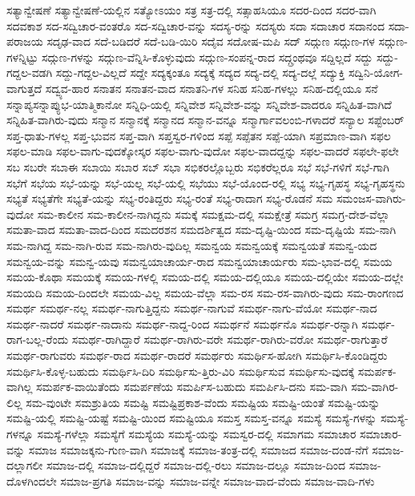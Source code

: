 {ಸತ್ಯಾನ್ವೇಷಣೆ
ಸತ್ಯಾನ್ವೇಷಣೆ-ಯಲ್ಲಿನ
ಸತ್ಯೋಽಯಂ
ಸತ್ರ
ಸತ್ರ-ದಲ್ಲಿ
ಸತ್ಸಾಹಸಿಯೂ
ಸದರ-ದಿಂದ
ಸದರ-ವಾಗಿ
ಸದವಕಾಶ
ಸದ-ಸದ್ವಿಚಾರ-ವಂತರೊ
ಸದ-ಸದ್ವಿಚಾರ-ವನ್ನು
ಸದಸ್ಯ-ರನ್ನು
ಸದಸ್ಯರು
ಸದಾ
ಸದಾಚಾರ
ಸದಾನಂದ
ಸದಾ-ಪರಾಜಯ
ಸದೃಢ-ವಾದ
ಸದೆ-ಬಡಿದರೆ
ಸದೆ-ಬಡಿ-ಯಿರಿ
ಸದೈವ
ಸದೋಷ-ಮಪಿ
ಸದ್
ಸದ್ಗುಣ
ಸದ್ಗುಣ-ಗಳ
ಸದ್ಗುಣ-ಗಳನ್ನಿಟ್ಟು
ಸದ್ಗುಣ-ಗಳನ್ನು
ಸದ್ಗುಣ-ವೆನ್ನಿಸಿ-ಕೊಳ್ಳುವುದು
ಸದ್ಗುಣ-ಸಂಪನ್ನ-ರಾದ
ಸದ್ಗ್ರಂಥವೂ
ಸದ್ದಿಲ್ಲದೆ
ಸದ್ದು
ಸದ್ದು-ಗದ್ದಲ-ವಡಗಿ
ಸದ್ದು-ಗದ್ದಲ-ವಿಲ್ಲದೆ
ಸದ್ದೇ
ಸದ್ಯಕ್ಕಂತೂ
ಸದ್ಯಕ್ಕೆ
ಸದ್ಯದ
ಸದ್ಯ-ದಲ್ಲಿ
ಸದ್ಯ-ದಲ್ಲೆ
ಸದ್ಯುಕ್ತಿ
ಸದ್ವಿನಿ-ಯೋಗ-ವಾಗುತ್ತದೆ
ಸದ್ವ್ಯವ-ಹಾರ
ಸನಾತನ
ಸನಾತನ-ವಾದ
ಸನಾತನಿ-ಗಳ
ಸನಿಹ
ಸನಿಹ-ಗಳಲ್ಲು
ಸನಿಹ-ದಲ್ಲಿಯೂ
ಸನೆ
ಸನ್ನಾಪ್ಯಸನ್ನಾಪ್ಯುಭ-ಯಾತ್ಮಿಕಾನೋ
ಸನ್ನಿಧಿ-ಯಲ್ಲಿ
ಸನ್ನಿವೇಶ
ಸನ್ನಿವೇಶ-ವನ್ನು
ಸನ್ನಿವೇಶ-ವಾದರೂ
ಸನ್ನಿಹಿತ-ವಾಗಿದೆ
ಸನ್ನಿಹಿತ-ವಾಗಿರು-ವುದು
ಸನ್ಮಾನ
ಸನ್ಮಾನಕ್ಕೆ
ಸನ್ಮಾನದ
ಸನ್ಮಾನ-ವನ್ನೂ
ಸನ್ಮಾರ್ಗಾವಲಂಬಿ-ಗಳಾದರೆ
ಸನ್ಯಾಲ
ಸಪ್ಟೆಂಬರ್
ಸಪ್ತ-ಧಾತು-ಗಳಲ್ಲ
ಸಪ್ತ-ಭುವನ
ಸಪ್ತ-ವಾಗಿ
ಸಪ್ತಸ್ವರ-ಗಳಿಂದ
ಸಪ್ಪೆ
ಸಪ್ಪೆತನ
ಸಪ್ಪೆ-ಯಾಗಿ
ಸಪ್ರಮಾಣ-ವಾಗಿ
ಸಫಲ
ಸಫಲ-ಮಾಡಿ
ಸಫಲ-ವಾಗು-ವುದಕ್ಕೋಸ್ಕರ
ಸಫಲ-ವಾಗು-ವುದೋ
ಸಫಲ-ವಾದದ್ದನ್ನು
ಸಫಲ-ವಾದರೆ
ಸಫಲೇ-ಫಲೇ
ಸಬ
ಸಬರೇ
ಸಬಾಈ
ಸಬಾಯಿ
ಸಬಾರ
ಸಬ್
ಸಭಾ
ಸಭಿಕರಲ್ಲೊಬ್ಬರು
ಸಭಿಕರೆಲ್ಲರೂ
ಸಭೆ
ಸಭೆ-ಗಳಿಗೆ
ಸಭೆ-ಗಾಗಿ
ಸಭೆಗೆ
ಸಭೆಯ
ಸಭೆ-ಯನ್ನು
ಸಭೆ-ಯಲ್ಲ
ಸಭೆ-ಯಲ್ಲಿ
ಸಭೆಯು
ಸಭೆ-ಯೊಂದ-ರಲ್ಲಿ
ಸಭ್ಯ
ಸಭ್ಯ-ಗೃಹಸ್ಥ
ಸಭ್ಯ-ಗೃಹಸ್ಥನು
ಸಭ್ಯತೆ
ಸಭ್ಯತೆಗೇ
ಸಭ್ಯತೆ-ಯನ್ನು
ಸಭ್ಯ-ರಂತಿದ್ದರು
ಸಭ್ಯ-ರಂತೆ
ಸಭ್ಯ-ರಾದಾಗ
ಸಭ್ಯ-ರೊಡನೆ
ಸಮ
ಸಮಂಜಸ-ವಾಗಿರು-ವುದೋ
ಸಮ-ಕಾಲೀನ
ಸಮ-ಕಾಲೀನ-ನಾಗಿದ್ದನು
ಸಮಕ್ಕೆ
ಸಮಕ್ಷಮ-ದಲ್ಲಿ
ಸಮಕ್ಷೇತ್ರೆ
ಸಮಗ್ರ
ಸಮಗ್ರ-ದೇಶ-ವೆಲ್ಲಾ
ಸಮತಾ-ವಾದ
ಸಮತಾ-ವಾದ-ದಿಂದ
ಸಮದರಶನ
ಸಮದರ್ಶಿತ್ವದ
ಸಮ-ದೃಷ್ಟಿ-ಯಿಂದ
ಸಮ-ದೃಷ್ಟಿಯೆ
ಸಮ-ನಾಗಿ
ಸಮ-ನಾಗಿದ್ದ
ಸಮ-ನಾಗಿ-ರುವ
ಸಮ-ನಾಗಿರು-ವುದಿಲ್ಲ
ಸಮನ್ವಯ
ಸಮನ್ವಯಕ್ಕೆ
ಸಮನ್ವಯತೆ
ಸಮನ್ವ-ಯದ
ಸಮನ್ವಯ-ವನ್ನು
ಸಮನ್ವ-ಯವು
ಸಮನ್ವಯಾಚಾರ್ಯ-ರಾದ
ಸಮನ್ವಯಾಚಾರ್ಯರು
ಸಮ-ಭಾವ-ದಲ್ಲಿ
ಸಮಯ
ಸಮಯ-ಕೊಥಾ
ಸಮಯಕ್ಕೆ
ಸಮಯ-ಗಳಲ್ಲಿ
ಸಮಯ-ದಲ್ಲಿ
ಸಮಯ-ದಲ್ಲಿಯೂ
ಸಮಯ-ದಲ್ಲಿಯೇ
ಸಮಯ-ದಲ್ಲೇ
ಸಮಯದಿ
ಸಮಯ-ದಿಂದಲೇ
ಸಮಯ-ವಿಲ್ಲ
ಸಮಯ-ವೆಲ್ಲಾ
ಸಮ-ರಸ
ಸಮ-ರಸ-ವಾಗಿರು-ವುದು
ಸಮ-ರಾಂಗಣದ
ಸಮರ್ಥ
ಸಮರ್ಥ-ನಲ್ಲ
ಸಮರ್ಥ-ನಾಗುತ್ತಿದ್ದನು
ಸಮರ್ಥ-ನಾಗುವೆ
ಸಮರ್ಥ-ನಾಗು-ವೆಯೋ
ಸಮರ್ಥ-ನಾದ
ಸಮರ್ಥ-ನಾದರೆ
ಸಮರ್ಥ-ನಾದಾನು
ಸಮರ್ಥ-ನಾದ್ದ-ರಿಂದ
ಸಮರ್ಥನೆ
ಸಮರ್ಥನೊ
ಸಮರ್ಥ-ರನ್ನಾಗಿ
ಸಮರ್ಥ-ರಾಗ-ಬಲ್ಲ-ರೆಂದು
ಸಮರ್ಥ-ರಾಗಿದ್ದಾರೆ
ಸಮರ್ಥ-ರಾಗಿರು-ವರೇ
ಸಮರ್ಥ-ರಾಗಿರು-ವರೋ
ಸಮರ್ಥ-ರಾಗುತ್ತಾರೆ
ಸಮರ್ಥ-ರಾಗುವರು
ಸಮರ್ಥ-ರಾದ
ಸಮರ್ಥ-ರಾದರೆ
ಸಮರ್ಥರು
ಸಮರ್ಥಿಸ-ಹೋಗಿ
ಸಮರ್ಥಿಸಿ-ಕೊಂಡಿದ್ದರು
ಸಮರ್ಥಿಸಿ-ಕೊಳ್ಳ-ಬಹುದು
ಸಮರ್ಥಿಸಿ-ದಿರಿ
ಸಮರ್ಥಿಸು-ತ್ತಿರು-ವಿರಿ
ಸಮರ್ಥಿಸುವ
ಸಮರ್ಥಿಸು-ವುದಕ್ಕೆ
ಸಮರ್ಪಕ-ವಾಗಿಲ್ಲ
ಸಮರ್ಪಕ-ವಾಯಿತೆಂದು
ಸಮರ್ಪಣೆಯ
ಸಮರ್ಪಿಸ-ಬಹುದು
ಸಮರ್ಪಿಸಿ-ದನು
ಸಮ-ವಾಗಿ
ಸಮ-ವಾಗಿರ-ಲಿಲ್ಲ
ಸಮ-ವುಂಟೇ
ಸಮಶ್ರುತಿಯ
ಸಮಷ್ಟಿ
ಸಮಷ್ಟಿಪ್ರಕಾಶ-ವೆಂದು
ಸಮಷ್ಟಿಯ
ಸಮಷ್ಟಿ-ಯಂತೆ
ಸಮಷ್ಟಿ-ಯನ್ನು
ಸಮಷ್ಟಿ-ಯಲ್ಲಿ
ಸಮಷ್ಟಿ-ಯಷ್ಟೆ
ಸಮಷ್ಟಿ-ಯಿಂದ
ಸಮಷ್ಟಿಯೂ
ಸಮಸ್ತ
ಸಮಸ್ತ-ವನ್ನೂ
ಸಮಸ್ಯೆ
ಸಮಸ್ಯೆ-ಗಳನ್ನು
ಸಮಸ್ಯೆ-ಗಳನ್ನೂ
ಸಮಸ್ಯೆ-ಗಳೆಲ್ಲಾ
ಸಮಸ್ಯೆಗೆ
ಸಮಸ್ಯೆಯ
ಸಮಸ್ಯೆ-ಯನ್ನು
ಸಮಸ್ವರ-ದಲ್ಲಿ
ಸಮಾಗಮ
ಸಮಾಚಾರ
ಸಮಾಚಾರ-ವನ್ನು
ಸಮಾಜ
ಸಮಾಜಕ್ಕನು-ಗುಣ-ವಾಗಿ
ಸಮಾಜಕ್ಕೆ
ಸಮಾಜ-ತಂತ್ರ-ದಲ್ಲಿ
ಸಮಾಜದ
ಸಮಾಜ-ದಂಡ-ನೆಗೆ
ಸಮಾಜ-ದಲ್ಲಾಗಲೀ
ಸಮಾಜ-ದಲ್ಲಿ
ಸಮಾಜ-ದಲ್ಲಿದ್ದರೆ
ಸಮಾಜ-ದಲ್ಲಿ-ರಲು
ಸಮಾಜ-ದಲ್ಲೂ
ಸಮಾಜ-ದಿಂದ
ಸಮಾಜ-ದೊಳಗಿಂದಲೇ
ಸಮಾಜ-ಪ್ರಗತಿ
ಸಮಾಜ-ವನ್ನು
ಸಮಾಜ-ವನ್ನೇ
ಸಮಾಜ-ವಾದ-ವೆಂದು
ಸಮಾಜ-ವಾದಿ-ಗಳು
}
